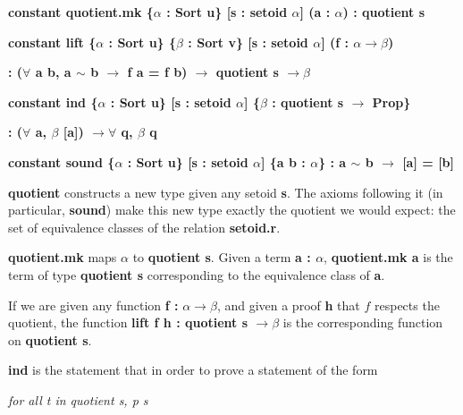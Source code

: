 \documentclass[runningheads,a4paper]{llncs}
\renewcommand{\a}{\alpha}
\renewcommand{\b}{\beta}
\renewcommand{\-}{\setminus}
\begin{document}
\vspace{4 mm}

\hspace{2 em}\textbf{constant quotient.mk \{$\a$ : Sort u\} [s : setoid $\a$] (a : $\a$) : quotient s}

\vspace{4 mm}

\hspace{2 em}\textbf{constant lift \{$\a$ : Sort u\} \{$\b$ : Sort v\} [s : setoid $\a$] (f : $\a \to \b$)}

\hspace{4 em}\textbf{: ($\forall$ a b, a $\sim$ b $\to$ f a = f b) $\to$ quotient s $\to \b$}

\vspace{4 mm}

\hspace{2 em}\textbf{constant ind \{$\a$ : Sort u\} [s : setoid $\a$] \{$\b$ : quotient s $\to$ Prop\} }

\hspace{4 em}\textbf{: ($\forall$ a, $\b$ [a]) $\to \forall$ q, $\b$ q}

\vspace{4 mm}

\hspace{2 em}\textbf{constant sound \{$\a$ : Sort u\} [s : setoid $\a$] \{a b : $\a$\} : a $\sim$ b $\to$ [a] = [b]}
\vspace{2 mm}

\textbf{quotient} constructs a new type given any setoid \textbf{s}. The axioms following it (in particular, \textbf{sound}) make this new type exactly the quotient we would expect: the set of equivalence classes of the relation \textbf{setoid.r}.

\textbf{quotient.mk} maps $\a$ to \textbf{quotient s}. Given a term \textbf{a : $\a$}, \textbf{quotient.mk a} is the term of type \textbf{quotient s} corresponding to the equivalence class of \textbf{a}.

If we are given any function \textbf{f :} $\a \to \b$, and given a proof \textbf{h} that $f$ respects the quotient, the function \textbf{lift f h : quotient s $\to \b$} is the corresponding function on \textbf{quotient s}.

\textbf{ind} is the statement that in order to prove a statement of the form

\vspace{2 mm}
\hspace{2 em}\textit{for all t in quotient s, p s}
\vspace{2 mm}
\end{document}
